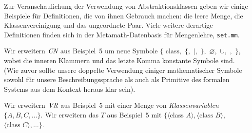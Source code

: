 Zur Veranschaulichung der Verwendung von Abstraktionsklassen geben wir einige Beispiele für Definitionen, die von ihnen Gebrauch machen: die leere Menge, die Klassenvereinigung und das ungeordnete Paar.  Viele weitere derartige Definitionen finden sich in der Metamath-Datenbasis für Mengenlehre, \texttt{set.mm}.

Wir erweitern $\mbox{\em CN}$ aus Beispiel~5 um neue Symbole $\{$ $\mbox{class},$ $\{,$ $|,$ $\},$ $\varnothing,$ $\cup,$ $,$ $\}$, wobei die inneren Klammern und das letzte Komma konstante Symbole sind. (Wie zuvor sollte unsere doppelte Verwendung einiger mathematischer Symbole sowohl für unsere Beschreibungssprache als auch als Primitive des formalen Systems aus dem Kontext heraus klar sein).

Wir erweitern $\mbox{\em VR}$ aus Beispiel~5 mit einer Menge von {\em Klassenvariablen} $\{A,B,C,\ldots\}$. Wir erweitern das $T$ aus Beispiel~5 mit $\{\langle \mbox{class\ } A\rangle, \langle \mbox{class\ }B\rangle,$ $\langle \mbox{class\ } C\rangle, \ldots\}$.

